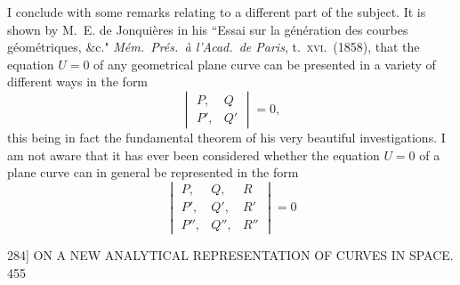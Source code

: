 \documentclass[11pt]{article}
\begin{document}
\smallskip

I conclude with some remarks relating to a different part of the subject. It is
shown by M.~E. de Jonqui\`eres in his ``Essai sur la g\'en\'eration des courbes
g\'eom\'etriques, \&c." \textit{M\'em.\ Pr\'es.\ \`a l'Acad.\ de Paris}, t.~\textsc{xvi}.\ (1858),
that the equation $U=0$ of any geometrical plane curve can be presented in a variety
of different ways in the form
\[ \begin{vmatrix} P, & Q \\ P', & Q' \end{vmatrix}=0, \]
this being in fact the fundamental theorem of his very beautiful investigations. I am
not aware that it has ever been considered whether the equation $U=0$ of a plane
curve can in general be represented in the form
\[ \begin{vmatrix} P, & Q, & R \\ P', & Q', & R' \\ P'', & Q'', & R'' \end{vmatrix}=0 \]

\begin{center}
\textsc{284]} \hfill ON A NEW ANALYTICAL REPRESENTATION OF CURVES IN SPACE. \hfill 455
\end{center}
\end{document}
